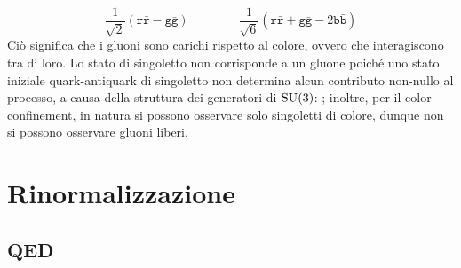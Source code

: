 \begin{equation*}
  \frac{1}{\sqrt{2}} (\mathtt{r}\bar{\mathtt{r}} - \mathtt{g}\bar{\mathtt{g}})
  \qquad \qquad
  \frac{1}{\sqrt{6}} (\mathtt{r}\bar{\mathtt{r}} + \mathtt{g}\bar{\mathtt{g}} - 2 \mathtt{b}\bar{\mathtt{b}})
\end{equation*}
Ciò significa che i gluoni sono carichi rispetto al colore, ovvero che interagiscono tra di loro. Lo stato di singoletto non corrisponde a un gluone poiché uno stato iniziale quark-antiquark di singoletto non determina alcun contributo non-nullo al processo, a causa della struttura dei generatori di $ \mathrm{SU}(3) $: ; inoltre, per il color-confinement, in natura si possono osservare solo singoletti di colore, dunque non si possono osservare gluoni liberi.

\section{Rinormalizzazione}

\subsection{QED}

